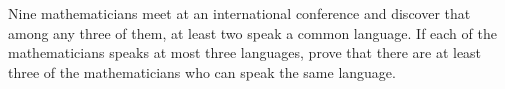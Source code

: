 Nine mathematicians meet at an international conference and discover that among any three of them, at least two speak a common language. If each of the mathematicians speaks at most three languages, prove that there are at least three of the mathematicians who can speak the same language.
